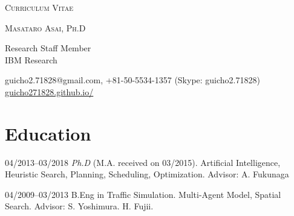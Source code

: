 \documentclass[letterpaper,11pt]{article}
\begin{document}
\pagestyle{empty}

\begin{center}
{\huge\textsc{Curriculum Vitae}}
\vspace{0.7\baselineskip}

{\Large\textsc{Masataro Asai, Ph.D}}
\vspace{0.5\baselineskip}

\small
{
Research Staff Member\\
IBM Research
}



 guicho2.71828@gmail.com, +81-50-5534-1357 (Skype: guicho2.71828) \url{guicho271828.github.io/}
\end{center}

%
%

\section{Education}

\begin{CV}
 \item[04/2013--03/2018] \textit{Ph.D} (M.A. received on 03/2015).
 Artificial Intelligence, Heuristic Search, Planning, Scheduling, Optimization.
 {\small %
 Advisor: A. Fukunaga}

 \item[04/2009--03/2013] B.Eng in Traffic Simulation.
 Multi-Agent Model, Spatial Search.
 {\small %
 Advisor: S. Yoshimura. H. Fujii.}
\end{CV}
\end{document}

